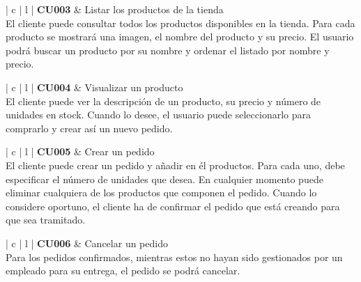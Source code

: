 \documentclass[11pt,spanish,listoffigures]{tfgetsinf}
\begin{document}
\begin{center}
\begin{tabular}{ | c | l | }
\hline
\textbf{ CU003 } & Listar los productos de la tienda \\
\hline
{}
{
El cliente puede consultar todos los productos disponibles en la tienda. Para cada producto se mostrará una imagen, el nombre del producto y su precio. El usuario podrá buscar un producto por su nombre y ordenar el listado por nombre y precio.
} \\
\hline
\end{tabular}
\end{center}

\begin{center}
\begin{tabular}{ | c | l | }
\hline
\textbf{ CU004 } & Visualizar un producto \\
\hline
{}
{
El cliente puede ver la descripción de un producto, su precio y número de unidades en stock. Cuando lo desee, el usuario puede seleccionarlo para comprarlo y crear así un nuevo pedido.
} \\
\hline
\end{tabular}
\end{center}

\begin{center}
\begin{tabular}{ | c | l | }
\hline
\textbf{ CU005 } & Crear un pedido \\
\hline
{}
{
El cliente puede crear un pedido y añadir en él productos. Para cada uno, debe especificar el número de unidades que desea. En cualquier momento puede eliminar cualquiera de los productos que componen el pedido. Cuando lo considere oportuno, el cliente ha de confirmar el pedido que está creando para que sea tramitado.
} \\
\hline
\end{tabular}
\end{center}

\begin{center}
\begin{tabular}{ | c | l | }
\hline
\textbf{ CU006 } & Cancelar un pedido \\
\hline
{}
{
Para los pedidos confirmados, mientras estos no hayan sido gestionados por un empleado para su entrega, el pedido se podrá cancelar.
} \\
\hline
\end{tabular}
\end{center}
\end{document}
